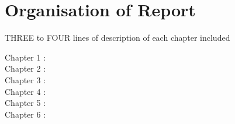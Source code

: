\chapter*{Organisation of Report}

	THREE to FOUR lines of description of each chapter included
\begin{description}
	\item[Chapter 1 :] 
	\item[Chapter 2 :] 
	\item[Chapter 3 :] 
	\item[Chapter 4 :]
	\item[Chapter 5 :]
	\item[Chapter 6 :]
\end{description}
